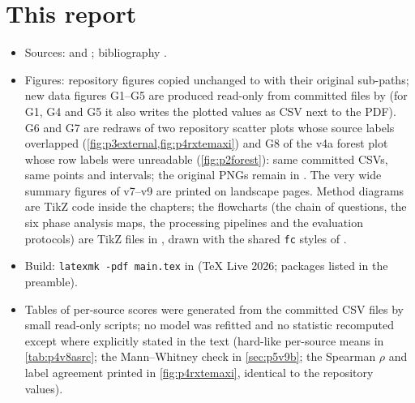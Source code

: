 \section{This report}
\begin{itemize}
\item Sources:  and ; bibliography .
\item Figures: repository figures copied unchanged to  with their original sub-paths; new data figures G1--G5 are
produced read-only from committed files by  (for G1, G4 and G5 it also writes the
plotted values as CSV next to the PDF). G6 and G7 are redraws of two repository scatter plots whose source labels overlapped
(\cref{fig:p3external,fig:p4rxtemaxi}) and G8 of the v4a forest plot whose row labels were unreadable (\cref{fig:p2forest}): same
committed CSVs, same points and intervals; the original PNGs remain in . The very wide summary figures of v7--v9 are printed on landscape pages. Method diagrams are TikZ code
inside the chapters; the flowcharts (the chain of questions, the six phase analysis maps, the processing pipelines and the
evaluation protocols) are TikZ files in , drawn with the shared \texttt{fc} styles of
.
\item Build: \verb|latexmk -pdf main.tex| in  (TeX Live 2026; packages listed in the preamble).
\item Tables of per-source scores were generated from the committed CSV files by small read-only scripts; no model was refitted and no
statistic recomputed except where explicitly stated in the text (hard-like per-source means in \cref{tab:p4v8asrc}; the Mann--Whitney
check in \cref{sec:p5v9b}; the Spearman $\rho$ and label agreement printed in \cref{fig:p4rxtemaxi}, identical to the repository values).
\end{itemize}
